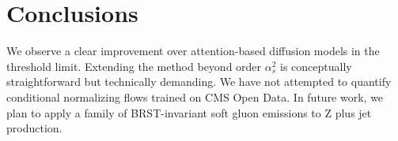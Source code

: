 \section{Conclusions}\label{sec:conclusions}

We observe a clear improvement over attention-based diffusion models in
the threshold limit. Extending the method beyond order $\alpha_s^2$ is
conceptually straightforward but technically demanding. We have not
attempted to quantify conditional normalizing flows trained on CMS Open
Data. In future work, we plan to apply a family of BRST-invariant soft
gluon emissions to Z plus jet production.

